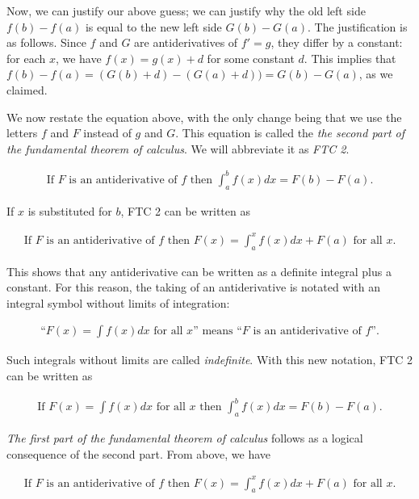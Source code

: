 Now, we can justify our above guess; we can justify why the old left side $f(b) - f(a)$ is equal to the new left side $G(b) - G(a)$. The justification is as follows. Since $f$ and $G$ are antiderivatives of $f' = g$, they differ by a constant: for each $x$, we have $f(x) = g(x) + d$ for some constant $d$. This implies that $f(b) - f(a) = (G(b) + d) - (G(a) + d)) = G(b) - G(a)$, as we claimed.

We now restate the equation above, with the only change being that we use the letters $f$ and $F$ instead of $g$ and $G$. This equation is called the \textit{the second part of the fundamental theorem of calculus}. We will abbreviate it as \textit{FTC 2}.

\begin{align*}
    \text{If $F$ is an antiderivative of $f$ then $\int_a^b f(x) dx = F(b) - F(a)$.}
\end{align*}

If $x$ is substituted for $b$, FTC 2 can be written as

\begin{align*}
    \text{If $F$ is an antiderivative of $f$ then $F(x) = \int_a^x f(x) dx + F(a)$ for all $x$}.
\end{align*}

This shows that any antiderivative can be written as a definite integral plus a constant. For this reason, the taking of an antiderivative is notated with an integral symbol without limits of integration:

\begin{align*}
    \text{``$F(x) = \int f(x) dx$ for all $x$'' means ``$F$ is an antiderivative of $f$''}.
\end{align*}

Such integrals without limits are called \textit{indefinite}. With this new notation, FTC 2 can be written as

\begin{align*}
    \text{If $F(x) = \int f(x) dx$ for all $x$ then $\int_a^b f(x) dx = F(b) - F(a)$}.
\end{align*}

\textit{The first part of the fundamental theorem of calculus} follows as a logical consequence of the second part. From above, we have

\begin{align*}
    \text{If $F$ is an antiderivative of $f$ then $F(x) = \int_a^x f(x) dx + F(a)$ for all $x$}.
\end{align*}

